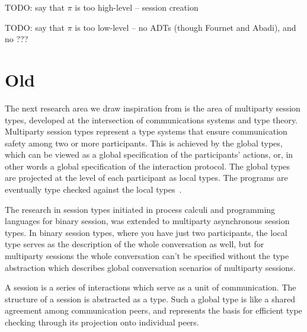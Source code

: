 \documentclass[a4paper,12pt,oneside,fleqn]{book} %
\begin{document}
TODO: say that $\pi$ is too high-level -- session creation

TODO: say that $\pi$ is too low-level
  -- no ADTs (though Fournet and Abadi), and no ???

\section{Old}



The next research area we draw inspiration from is the area of multiparty
session types, developed at the intersection of communications systems and
type theory. Multiparty session types represent a type systems that ensure
communication safety among two or more participants. This is achieved by
the global types, which can be viewed as a global specification of the
participants' actions, or, in other words a global specification of the
interaction protocol. The global types are projected at the level of each
participant as local types. The programs are eventually type checked
against the local types~\cite{DBLP:journals/jacm/HondaYC16}.

The research in session types initiated in process calculi and programming
languages for binary session, was extended to multiparty asynchronous
session types. In binary session types, where you have just two
participants, the local type serves as the description of the whole
conversation as well, but for multiparty sessions the whole conversation
can't be specified without the type abstraction which describes global
conversation scenarios of multiparty sessions.~\cite{DBLP:journals/jacm/HondaYC16}

A session is a series of interactions which serve as a unit of
communication. The structure of a session is abstracted as a type. Such a
global type is like a shared agreement among communication peers, and
represents the basis for efficient type checking through its projection
onto individual peers.
\end{document}
